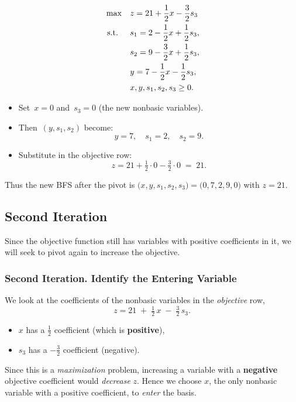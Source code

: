 \begin{tcolorbox}[colback=algpivot!6, colframe=algpivot, coltitle=white, fonttitle=\bfseries, sharp corners, title={\ding{114}\ Pivot: Second Dictionary}]

\[
\begin{aligned}
\max\quad 
& z =  21 + \frac{1}{2}x - \frac{3}{2}s_3 \\
\mbox{ s.t. }\quad 
& s_1  = 2 - \frac{1}{2}x + \frac{1}{2}s_3, \\
& s_2  = 9 - \frac{3}{2}x + \frac{1}{2}s_3, \\
& y = 7 - \frac{1}{2}x - \frac{1}{2}s_3, \\
& x, y, s_1, s_2, s_3 \ge 0.
\end{aligned}
\]

\begin{itemize}
  \item Set \(\,x=0\) and \(\,s_3=0\) (the new nonbasic variables). 
  \item Then \(\,(y,s_1,s_2)\) become:
  \[
  y = 7, 
  \quad
  s_1 = 2,
  \quad
  s_2 = 9.
  \]
  \item Substitute in the objective row:
  \[
  z = 21 + \tfrac12\cdot 0 - \tfrac32\cdot 0 \;=\; 21.
  \]
\end{itemize}
Thus the new BFS after the pivot is 
\(\bigl(x,y,s_1,s_2,s_3\bigr) = \bigl(0,7,2,9,0\bigr)\) 
with \(z=21\).
\end{tcolorbox}

\subsection*{Second Iteration}
Since the objective function still has variables with positive coefficients in it, we will seek to pivot again to increase the objective.

\subsubsection*{Second Iteration. Identify the Entering Variable}
\begin{tcolorbox}[colback=algenter!6, colframe=algenter, coltitle=white, fonttitle=\bfseries, sharp corners, title={\ding{43}\ Second Iteration: Entering Variable}]
We look at the coefficients of the nonbasic variables in the \emph{objective} row,
\[
z = 21 \;+\; \tfrac12\,x \;-\;\tfrac32\,s_3.
\]
\begin{itemize}
  \item \(x\) has a \(\tfrac12\) coefficient (which is \textbf{positive}), 
  \item \(s_3\) has a \(-\tfrac32\) coefficient (negative).
\end{itemize}
Since this is a \emph{maximization} problem, increasing a variable with a \textbf{negative} objective coefficient would \emph{decrease} \(z\).  
Hence we choose \(x\), the only nonbasic variable with a positive coefficient, to \emph{enter} the basis.
\end{tcolorbox}
